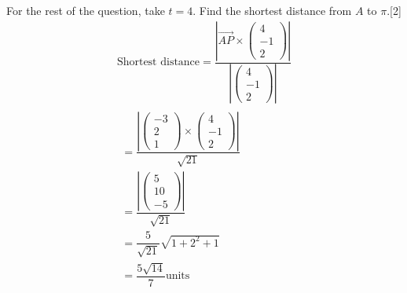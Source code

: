 \documentclass[12pt, a4 paper]{article}
\begin{document}
\begin{outline}[enumerate]
					\color{black}
					For the rest of the question, take $t = 4$.
					\2	Find the shortest distance from $A$ to $\pi $.\hfill[2]
					\color{blue}
					\begin{align*}
						{\textrm{Shortest distance}} = \dfrac{{\left| {\overrightarrow {AP}  \times \left( {\begin{array}{*{20}{c}}4 \\{ - 1}\\2\end{array}} \right)} \right|}}{{\left| {\left( {\begin{array}{*{20}{c}}4\\{ - 1}\\2\end{array}} \right)} \right|}}\\
						\begin{array}{c} = \dfrac{{\left| {\left( {\begin{array}{*{20}{c}}{ - 3}                                     \\2\\1\end{array}} \right) \times \left( {\begin{array}{*{20}{c}}4\\{ - 1}\\2\end{array}} \right)} \right|}}{{\sqrt {21} }}\\ = \dfrac{{\left| {\left( {\begin{array}{*{20}{c}}5\\{10}\\{ - 5}\end{array}} \right)} \right|}}{{\sqrt {21} }}\\ = \dfrac{5}{{\sqrt {21} }}\sqrt {1 + {2^2} + 1} \\ = \dfrac{{5\sqrt {14} }}{7}{\textrm{units}}\end{array}
					\end{align*}
															

\end{outline}
\end{document}
